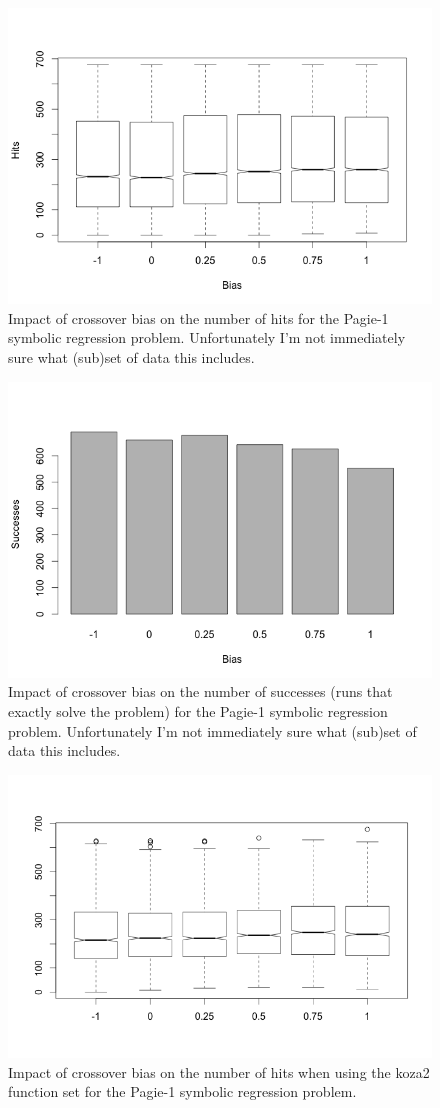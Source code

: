\documentclass{sig-alternate}
\begin{document}
\begin{figure}
\centering
\includegraphics[width=0.45 \textwidth]{Plots/Pagie-1_Hits_vs_Bias.png}
\caption{Impact of crossover bias on the number of hits for the Pagie-1 symbolic regression problem. Unfortunately I'm not immediately sure what (sub)set of data this includes.}
\label{fig:Pagie1Hits}
\end{figure}

\begin{figure}
\centering
\includegraphics[width=0.45 \textwidth]{Plots/Pagie-1_Successes_vs_Bias.png}
\caption{Impact of crossover bias on the number of successes (runs that exactly solve the problem) for the Pagie-1 symbolic regression problem. Unfortunately I'm not immediately sure what (sub)set of data this includes.}
\label{fig:Pagie1Successes}
\end{figure}

\begin{figure}
\centering
\includegraphics[width=0.45 \textwidth]{Plots/Pagie-1-koza2_no_Tarpeian.png}
\caption{Impact of crossover bias on the number of hits when using the koza2 function set for the Pagie-1 symbolic regression problem.}
\label{fig:Pagie1Koza2}
\end{figure}
\end{document}
